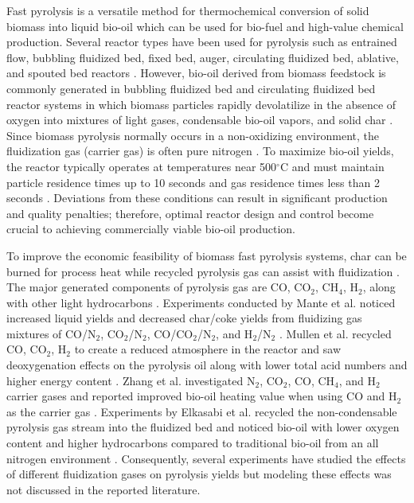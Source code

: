 \documentclass{article}
\begin{document}
Fast pyrolysis is a versatile method for thermochemical conversion of solid biomass into liquid bio-oil which can be used for bio-fuel and high-value chemical production. Several reactor types have been used for pyrolysis such as entrained flow, bubbling fluidized bed, fixed bed, auger, circulating fluidized bed, ablative, and spouted bed reactors \cite{Uddin-2018, Bridgwater-1991}. However, bio-oil derived from biomass feedstock is commonly generated in bubbling fluidized bed and circulating fluidized bed reactor systems in which biomass particles rapidly devolatilize in the absence of oxygen into mixtures of light gases, condensable bio-oil vapors, and solid char \cite{Bridgwater-1999, Bridgwater-2018a, Mohan-2006}. Since biomass pyrolysis normally occurs in a non-oxidizing environment, the fluidization gas (carrier gas) is often pure nitrogen \cite{Mohan-2006}. To maximize bio-oil yields, the reactor typically operates at temperatures near 500$^\circ$C and must maintain particle residence times up to 10 seconds and gas residence times less than 2 seconds \cite{Bridgwater-2018a}. Deviations from these conditions can result in significant production and quality penalties; therefore, optimal reactor design and control become crucial to achieving commercially viable bio-oil production.

To improve the economic feasibility of biomass fast pyrolysis systems, char can be burned for process heat while recycled pyrolysis gas can assist with fluidization \cite{Bridgwater-1999, Mante-2012, Elkasabi-2015}. The major generated components of pyrolysis gas are CO, CO$_2$, CH$_4$, H$_2$, along with other light hydrocarbons \cite{Asadullah-2008, Zhang-2011}. Experiments conducted by Mante et al. noticed increased liquid yields and decreased char/coke yields from fluidizing gas mixtures of CO/N$_2$, CO$_2$/N$_2$, CO/CO$_2$/N$_2$, and H$_2$/N$_2$ \cite{Mante-2012}. Mullen et al. recycled CO, CO$_2$, H$_2$ to create a reduced atmosphere in the reactor and saw deoxygenation effects on the pyrolysis oil along with lower total acid numbers and higher energy content \cite{Mullen-2013}. Zhang et al. investigated N$_2$, CO$_2$, CO, CH$_4$, and H$_2$ carrier gases and reported improved bio-oil heating value when using CO and H$_2$ as the carrier gas \cite{Zhang-2011}. Experiments by Elkasabi et al. recycled the non-condensable pyrolysis gas stream into the fluidized bed and noticed bio-oil with lower oxygen content and higher hydrocarbons compared to traditional bio-oil from an all nitrogen environment \cite{Elkasabi-2015}. Consequently, several experiments have studied the effects of different fluidization gases on pyrolysis yields but modeling these effects was not discussed in the reported literature.
\end{document}
